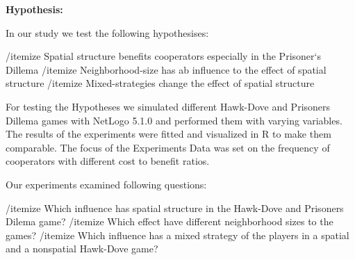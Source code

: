 \textbf{Hypothesis:}

In our study we test the following hypothesises: 

/itemize Spatial structure benefits cooperators especially in the Prisoner`s Dillema 
/itemize Neighborhood-size has ab influence to the effect of spatial structure
/itemize Mixed-strategies change the effect of spatial structure

For testing the Hypotheses we simulated different Hawk-Dove and Prisoners Dillema games with NetLogo 5.1.0 and performed them with varying variables. The results of the experiments were fitted and visualized in R to make them comparable. The focus of the Experiments Data was set on the frequency of cooperators with different cost to benefit ratios.

Our experiments examined following questions:

/itemize Which influence has spatial structure in the Hawk-Dove and Prisoners Dilema game?
/itemize Which effect have different neighborhood sizes to the games?
/itemize Which influence has a mixed strategy of the players in a spatial and a nonspatial Hawk-Dove game?

